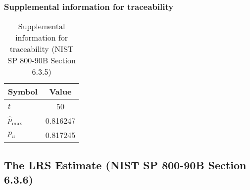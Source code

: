 \documentclass[a3paper,xelatex,english]{bxjsarticle}
\begin{document}
\subsubsection{Supplemental information for traceability}
\renewcommand{\arraystretch}{1.8}
\begin{table}[h]
\caption{Supplemental information for traceability (NIST SP 800-90B Section 6.3.5)}
\begin{center}
\begin{tabular}{|l|c|}
\hline 
\rowcolor{anotherlightblue} %
Symbol				& Value \\ \hline 
$t$				&       50\\ \hline 
$\hat{p}_{\textrm{max}}$ 			& 0.816247\\ \hline
$p_u$				& 0.817245\\ \hline
\end{tabular}
\end{center}
\end{table}
\renewcommand{\arraystretch}{1.4}
\clearpage
\subsection{The LRS Estimate (NIST SP 800-90B Section 6.3.6)}\label{sec:NonBinary636}
\end{document}
